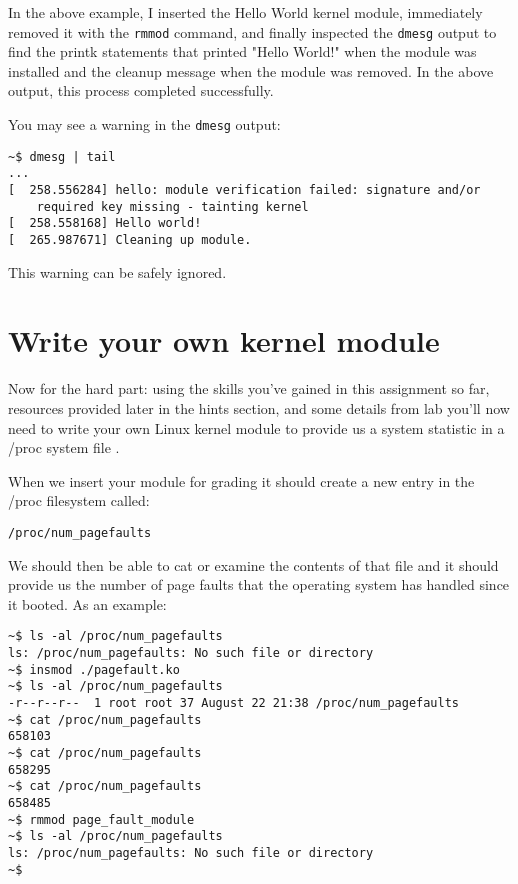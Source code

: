 \documentclass[11pt]{article}
\begin{document}
In the above example, I inserted the Hello World kernel module, immediately removed it with the \texttt {rmmod} command, and finally inspected the \texttt{dmesg} output to find the printk statements that printed "Hello World!" when the module was installed and the cleanup message when the module was removed. In the above output, this process completed successfully.

You may see a warning in the \texttt{dmesg} output:

\begin{verbatim}
~$ dmesg | tail
...
[  258.556284] hello: module verification failed: signature and/or  
	required key missing - tainting kernel
[  258.558168] Hello world!
[  265.987671] Cleaning up module.
\end{verbatim}

This warning can be safely ignored.

\section*{Write your own kernel module}

Now for the hard part: using the skills you've gained in this assignment so far, resources provided later in the hints section, and some details from lab you'll now need to write your own Linux kernel module to provide us a system statistic in a /proc system file \cite{cse551}. 

When we insert your module for grading it should create a new entry in the /proc filesystem called:

\begin{verbatim}
/proc/num_pagefaults
\end{verbatim}

\newpage

We should then be able to cat or examine the contents of that file and it should provide us the number of page faults that the operating system has handled since it booted. As an example:

\begin{verbatim}
~$ ls -al /proc/num_pagefaults
ls: /proc/num_pagefaults: No such file or directory
~$ insmod ./pagefault.ko 
~$ ls -al /proc/num_pagefaults
-r--r--r--  1 root root 37 August 22 21:38 /proc/num_pagefaults
~$ cat /proc/num_pagefaults 
658103
~$ cat /proc/num_pagefaults 
658295
~$ cat /proc/num_pagefaults 
658485
~$ rmmod page_fault_module
~$ ls -al /proc/num_pagefaults
ls: /proc/num_pagefaults: No such file or directory
~$
\end{verbatim}
\end{document}
